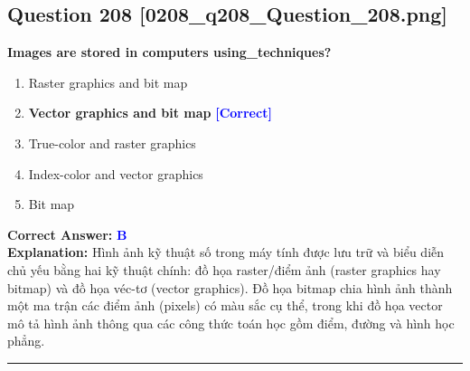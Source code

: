 \documentclass[11pt,a4paper]{article}
\begin{document}
\begin{minipage}{\textwidth}
\subsection*{Question 208 \quad \footnotesize{[0208\_q208\_Question\_208.png]}}
\noindent \textbf{Images are stored in computers using\_techniques?}

\begin{enumerate}[label=\Alph*.]
    \item Raster graphics and bit map
    \item \textbf{Vector graphics and bit map} \hfill \textcolor{blue}{\textbf{[Correct]}}
    \item True-color and raster graphics
    \item Index-color and vector graphics
    \item Bit map
\end{enumerate}

\noindent \textbf{Correct Answer:} \textcolor{blue}{\textbf{B}} \\[2pt]
\noindent \textbf{Explanation:} Hình ảnh kỹ thuật số trong máy tính được lưu trữ và biểu diễn chủ yếu bằng hai kỹ thuật chính: đồ họa raster/điểm ảnh (raster graphics hay bitmap) và đồ họa véc-tơ (vector graphics). Đồ họa bitmap chia hình ảnh thành một ma trận các điểm ảnh (pixels) có màu sắc cụ thể, trong khi đồ họa vector mô tả hình ảnh thông qua các công thức toán học gồm điểm, đường và hình học phẳng.

\par\vspace{0.3cm}
\hrule
\vspace{0.3cm}
\end{minipage}
\end{document}
